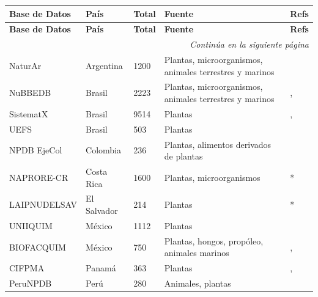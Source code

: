     \begin{longtable}{|p{3.5cm}|p{2cm}|p{2cm}|p{3.5cm}|p{2cm}|}

        \hline
        \textbf{Base de Datos} & \textbf{País}  &  \textbf{Total} & \textbf{Fuente}  & \textbf{Refs}\\ 

        \hline
        \endfirsthead
        
        \hline
        \textbf{Base de Datos} & \textbf{País} & \textbf{Total} & \textbf{Fuente} & \textbf{Refs}\\ 

        \hline
        \endhead
        
        \hline
        \multicolumn{5}{|r|}{\textit{Continúa en la siguiente página}} \\
        \hline
        \endfoot
        
        \hline
        \endlastfoot
        NaturAr & Argentina & 1200 & Plantas, microorganismos, animales terrestres y marinos & \cite{martinez2024naturar} \\ 
        \hline
        NuBBEDB & Brasil & 2223 & Plantas, microorganismos, animales terrestres y marinos & \cite{valli2013development}, \cite{pilon2017nubbedb} \\ 
        \hline
        SistematX & Brasil  & 9514 & Plantas & \cite{scotti2018sistematx}, \cite{costa2021sistematx} \\ 
        \hline
        UEFS & Brasil &  503 & Plantas &  \cite{uefsnp} \\ 
        \hline
        NPDB EjeCol & Colombia & 236 & Plantas, alimentos derivados de plantas &  \cite{rodriguez2024npdbejecol} \\ 
        \hline
        NAPRORE-CR & Costa Rica & 1600 & Plantas, microorganismos & *\\ 
        \hline
        LAIPNUDELSAV & El Salvador & 214 & Plantas &  * \\ 
        \hline
        UNIIQUIM & México & 1112 & Plantas & \cite{uniiquim} \\ 
        \hline
        BIOFACQUIM & México & 750 & Plantas, hongos, propóleo, animales marinos & \cite{pilon2019biofacquim}, \cite{sanchez2020functional} \\ 
        \hline
        CIFPMA & Panamá & 363 & Plantas & \cite{olmedo2017cheminformatic}, \cite{olmedo2019chemoinformatic} \\ 
        \hline
        PeruNPDB & Perú & 280 & Animales, plantas & \cite{barazorda2023perunpdb} \\ 
        \hline
    \end{longtable}


